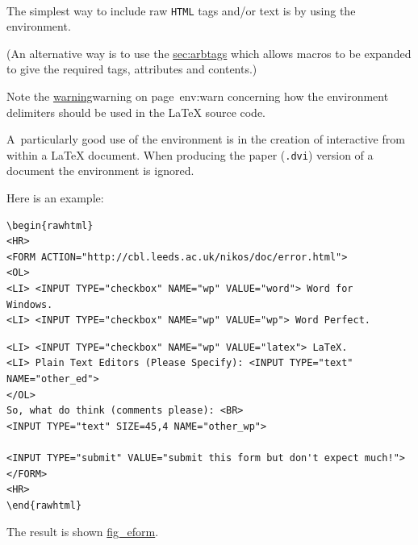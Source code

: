 %
\paragraph*{\label{rawhtml}}
The simplest way to include raw \texttt{HTML} tags and/or text 
is by using the  environment.
\begin{changebar}
(An alternative way is to use the  
\hyperref{command,}{command, described in Section~}{,}{sec:arbtags}
which allows macros to be expanded to give the required tags, attributes
and contents.)
\end{changebar}

\noindent
Note the \hyperref[page]{warning}{warning on page~}{}{env:warn}
concerning how the environment delimiters should be used in the
\LaTeX{} source code.

\medskip
{}\label{eform}\html{\\}\noindent
A~particularly good use of the  environment
is in the creation of interactive
from within a \LaTeX{}  document. 
When producing the paper (\texttt{.dvi}) version
of a document the  environment is ignored.

\medskip
{}\html{\\}%
\noindent
Here is an example: 
\begin{small}
\begin{verbatim}
\begin{rawhtml}
<HR>
<FORM ACTION="http://cbl.leeds.ac.uk/nikos/doc/error.html">
<OL>
<LI> <INPUT TYPE="checkbox" NAME="wp" VALUE="word"> Word for
Windows.
<LI> <INPUT TYPE="checkbox" NAME="wp" VALUE="wp"> Word Perfect.
\end{verbatim}
\begin{verbatim}
<LI> <INPUT TYPE="checkbox" NAME="wp" VALUE="latex"> LaTeX.
<LI> Plain Text Editors (Please Specify): <INPUT TYPE="text" NAME="other_ed">
</OL>
So, what do think (comments please): <BR>
<INPUT TYPE="text" SIZE=45,4 NAME="other_wp">

<INPUT TYPE="submit" VALUE="submit this form but don't expect much!">
</FORM>
<HR>
\end{rawhtml}
\end{verbatim}
\end{small}
%
\noindent
The result is shown \hyperref{below}{in Figure~}{}{fig_eform}.

